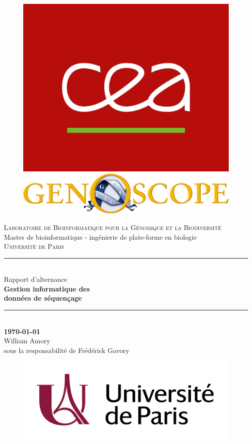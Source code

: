 \begin{titlepage}

    \newcommand{\HRule}{\rule{\linewidth}{0.5mm}} %
  
    \begin{figure}[ht!]
        \includegraphics[width=0.15\linewidth]{img/cea.jpg}
        \hspace{6cm}
        \includegraphics[width=0.5\linewidth]{img/genoscope_logo.png}
    \end{figure}
    \vspace{1cm}
  
    \begin{center}
  
        \textsc{\LARGE Laboratoire de Bioinformatique pour la Génomique et la Biodiversité}\\[1cm]
        \Large{ Master de bioinformatique - ingénierie de plate-forme en biologie \\ \textsc{Université de Paris}}\\[0.2cm]
  
  
        \vspace{1cm}
        \HRule \\[0.4cm]
        {\huge Rapport d'alternance}\\[0.2cm]
        {\Huge \bfseries Gestion informatique des \\ données de séquençage}\\
        \HRule \\[1cm]

        \LARGE{\textbf{\today}} \\[1cm]

        \LARGE{William Amory}\\
        \LARGE{sous la responsabilité de Frédérick Gavory}\\[1cm]
    
    \end{center}
  
    \begin{figure}[ht!]
        \includegraphics[width=0.4\linewidth]{img/logo}
    \end{figure}
    \newpage
  
\end{titlepage}